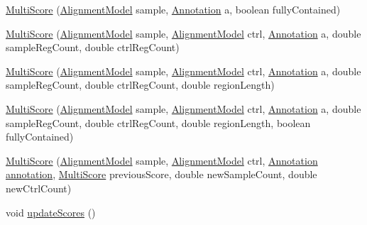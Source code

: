 \begin{DoxyCompactItemize}
\item 
\hyperlink{classumms_1_1core_1_1model_1_1score_1_1_multi_score_a26d349111b0da6601d08e24d3e69e393}{Multi\+Score} (\hyperlink{classumms_1_1core_1_1model_1_1_alignment_model}{Alignment\+Model} sample, \hyperlink{interfaceumms_1_1core_1_1annotation_1_1_annotation}{Annotation} a, boolean fully\+Contained)
\item 
\hyperlink{classumms_1_1core_1_1model_1_1score_1_1_multi_score_ad24b7fe11730808dd85c9e7585786a9d}{Multi\+Score} (\hyperlink{classumms_1_1core_1_1model_1_1_alignment_model}{Alignment\+Model} sample, \hyperlink{classumms_1_1core_1_1model_1_1_alignment_model}{Alignment\+Model} ctrl, \hyperlink{interfaceumms_1_1core_1_1annotation_1_1_annotation}{Annotation} a, double sample\+Reg\+Count, double ctrl\+Reg\+Count)
\item 
\hyperlink{classumms_1_1core_1_1model_1_1score_1_1_multi_score_afef75a2becacabcf8eb8fd06f58cf46c}{Multi\+Score} (\hyperlink{classumms_1_1core_1_1model_1_1_alignment_model}{Alignment\+Model} sample, \hyperlink{classumms_1_1core_1_1model_1_1_alignment_model}{Alignment\+Model} ctrl, \hyperlink{interfaceumms_1_1core_1_1annotation_1_1_annotation}{Annotation} a, double sample\+Reg\+Count, double ctrl\+Reg\+Count, double region\+Length)
\item 
\hyperlink{classumms_1_1core_1_1model_1_1score_1_1_multi_score_a600374ec2053ed7b2d1ffa6f841ae578}{Multi\+Score} (\hyperlink{classumms_1_1core_1_1model_1_1_alignment_model}{Alignment\+Model} sample, \hyperlink{classumms_1_1core_1_1model_1_1_alignment_model}{Alignment\+Model} ctrl, \hyperlink{interfaceumms_1_1core_1_1annotation_1_1_annotation}{Annotation} a, double sample\+Reg\+Count, double ctrl\+Reg\+Count, double region\+Length, boolean fully\+Contained)
\item 
\hyperlink{classumms_1_1core_1_1model_1_1score_1_1_multi_score_af56f7c93177dc36a2fa0e17d0fd24bbc}{Multi\+Score} (\hyperlink{classumms_1_1core_1_1model_1_1_alignment_model}{Alignment\+Model} sample, \hyperlink{classumms_1_1core_1_1model_1_1_alignment_model}{Alignment\+Model} ctrl, \hyperlink{interfaceumms_1_1core_1_1annotation_1_1_annotation}{Annotation} \hyperlink{classumms_1_1core_1_1model_1_1score_1_1_window_score_1_1_abstract_window_score_a455fb02f18f492e611113b9da0a24888}{annotation}, \hyperlink{classumms_1_1core_1_1model_1_1score_1_1_multi_score}{Multi\+Score} previous\+Score, double new\+Sample\+Count, double new\+Ctrl\+Count)
\item 
void \hyperlink{classumms_1_1core_1_1model_1_1score_1_1_multi_score_a3a05bf1336e0fb28997b3d40610c3fcf}{update\+Scores} ()

\end{DoxyCompactItemize}
